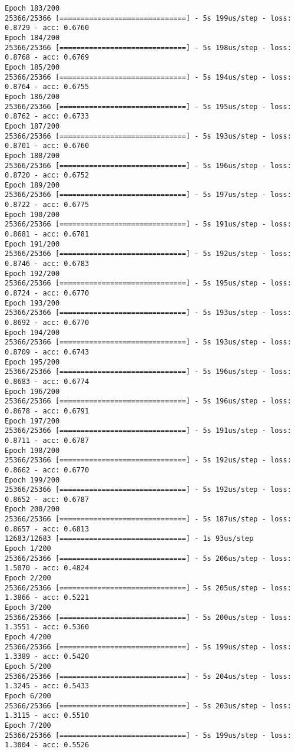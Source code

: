 \documentclass[11pt]{article}
\begin{document}
\begin{Verbatim}[commandchars=\\\{\}]
Epoch 183/200
25366/25366 [==============================] - 5s 199us/step - loss: 0.8729 - acc: 0.6760
Epoch 184/200
25366/25366 [==============================] - 5s 198us/step - loss: 0.8768 - acc: 0.6769
Epoch 185/200
25366/25366 [==============================] - 5s 194us/step - loss: 0.8764 - acc: 0.6755
Epoch 186/200
25366/25366 [==============================] - 5s 195us/step - loss: 0.8762 - acc: 0.6733
Epoch 187/200
25366/25366 [==============================] - 5s 193us/step - loss: 0.8701 - acc: 0.6760
Epoch 188/200
25366/25366 [==============================] - 5s 196us/step - loss: 0.8720 - acc: 0.6752
Epoch 189/200
25366/25366 [==============================] - 5s 197us/step - loss: 0.8722 - acc: 0.6775
Epoch 190/200
25366/25366 [==============================] - 5s 191us/step - loss: 0.8681 - acc: 0.6781
Epoch 191/200
25366/25366 [==============================] - 5s 192us/step - loss: 0.8746 - acc: 0.6783
Epoch 192/200
25366/25366 [==============================] - 5s 195us/step - loss: 0.8724 - acc: 0.6770
Epoch 193/200
25366/25366 [==============================] - 5s 193us/step - loss: 0.8692 - acc: 0.6770
Epoch 194/200
25366/25366 [==============================] - 5s 193us/step - loss: 0.8709 - acc: 0.6743
Epoch 195/200
25366/25366 [==============================] - 5s 196us/step - loss: 0.8683 - acc: 0.6774
Epoch 196/200
25366/25366 [==============================] - 5s 196us/step - loss: 0.8678 - acc: 0.6791
Epoch 197/200
25366/25366 [==============================] - 5s 191us/step - loss: 0.8711 - acc: 0.6787
Epoch 198/200
25366/25366 [==============================] - 5s 192us/step - loss: 0.8662 - acc: 0.6770
Epoch 199/200
25366/25366 [==============================] - 5s 192us/step - loss: 0.8652 - acc: 0.6787
Epoch 200/200
25366/25366 [==============================] - 5s 187us/step - loss: 0.8657 - acc: 0.6813
12683/12683 [==============================] - 1s 93us/step
Epoch 1/200
25366/25366 [==============================] - 5s 206us/step - loss: 1.5070 - acc: 0.4824
Epoch 2/200
25366/25366 [==============================] - 5s 205us/step - loss: 1.3866 - acc: 0.5221
Epoch 3/200
25366/25366 [==============================] - 5s 200us/step - loss: 1.3551 - acc: 0.5360
Epoch 4/200
25366/25366 [==============================] - 5s 199us/step - loss: 1.3389 - acc: 0.5420
Epoch 5/200
25366/25366 [==============================] - 5s 204us/step - loss: 1.3245 - acc: 0.5433
Epoch 6/200
25366/25366 [==============================] - 5s 203us/step - loss: 1.3115 - acc: 0.5510
Epoch 7/200
25366/25366 [==============================] - 5s 199us/step - loss: 1.3004 - acc: 0.5526

\end{Verbatim}
\end{document}
